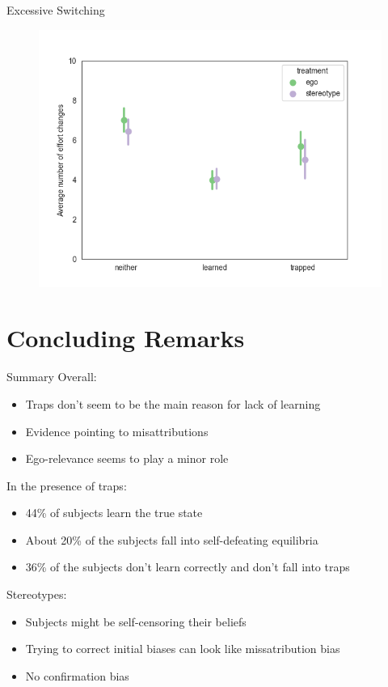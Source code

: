 \documentclass[aspectratio=169]{beamer}
\begin{document}
\begin{frame}{Excessive Switching}
    \begin{figure}
        \centering
        \includegraphics[scale=.6]{switching.png}
    \end{figure}

\end{frame}


\section*{Concluding Remarks}

\begin{frame}{Summary}
    Overall:\\
        \begin{itemize}
            \item Traps don't seem to be the main reason for lack of learning
            \item Evidence pointing to misattributions
            \item Ego-relevance seems to play a minor role
        \end{itemize}
        \bigskip
    In the presence of traps:\\
        \begin{itemize}
            \item 44\% of subjects learn the true state
            \item About 20\% of the subjects fall into self-defeating equilibria
            \item 36\% of the subjects don't learn correctly and don't fall into traps
        \end{itemize} 
    \bigskip
    Stereotypes:\\
        \begin{itemize}
            \item Subjects might be self-censoring their beliefs
            \item Trying to correct initial biases can look like missatribution bias
            \item No confirmation bias
        \end{itemize}

\end{frame}
\end{document}
